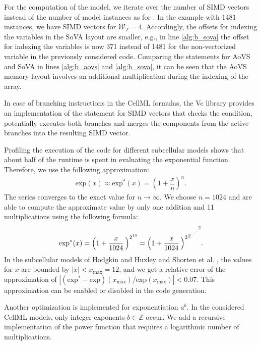 For the computation of the model, we iterate over the number  of SIMD vectors instead of the number of model instances as for . In the example with 1481 instances, we have  SIMD vectors for $\mathcal{W}_T=4$. 
Accordingly, the offsets for indexing the variables in the SoVA layout are smaller, e.g., in line \ref{alg:b_sova} the offset for indexing the  variables is now 371 instead of 1481 for the non-vectorized variable in the previously considered  code. 
Comparing the statements for AoVS and SoVA in lines \ref{alg:b_aovs} and \ref{alg:b_sova}, it can be seen that the AoVS memory layout involves an additional multiplication during the indexing of the array.

In case of branching instructions in the CellML formulas, the Vc library provides an implementation of the  statement for SIMD vectors that checks the condition, potentially executes both branches and merges the components from the active branches into the resulting SIMD vector.

Profiling the execution of the  code for different subcellular models shows that about half of the runtime is spent in evaluating the exponential function. Therefore, we use the following approximation:
\begin{align*}
  \textrm{exp}(x) \approx \textrm{exp}^\ast(x) = \left( 1 + \dfrac{x}{n}\right)^n.
\end{align*}
The series converges to the exact value for $n\to \infty$. We choose $n=1024$ and are able to compute the approximate value by only one addition and 11 multiplications using the following formula:
\begin{align*}
    \textrm{exp}^\ast(x) = \left( 1 + \dfrac{x}{1024}\right)^{2^{10}} = {{{\left( 1 + \dfrac{x}{1024}\right)^2}^2}^{\scriptsize\iddots}}^2.
\end{align*}
%
In the subcellular models of Hodgkin and Huxley \cite{Hodgkin1952} and Shorten et al. \cite{shorten2007mathematical}, the values for $x$ are bounded by $|x| < x_\text{max} = 12$, and we get a relative error of the approximation of $|(\textrm{exp}^\ast - \textrm{exp})(x_\text{max}) / \textrm{exp}(x_\text{max})| < 0.07.$
This approximation can be enabled or disabled in the code generation.

Another optimization is implemented for exponentiation $a^b$. In the considered CellML models, only integer exponents $b\in \mathbb{Z}$ occur. We add a recursive implementation of the power function that requires a logarithmic number of multiplications. 

